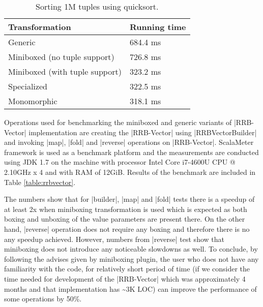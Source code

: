 \begin{table}[t]
  \begin{tabularx}{0.48\textwidth}{|g *{1}{|Y}|} \hline
    \textbf{Transformation} & \textbf{Running time}  \\ \hline
    Generic                        &              684.4 ms  \\
    Miniboxed (no tuple support)   &              726.8 ms  \\
    Miniboxed (with tuple support) &              323.2 ms  \\
    Specialized                    &              322.5 ms  \\
    Monomorphic                    &              318.1 ms  \\ \hline
  \end{tabularx}
  \vspace{-2mm}
  \caption{Sorting 1M tuples using quicksort.}
  \label{table:tuple}
  \vspace{-3em}
\end{table}


Operations used for benchmarking the miniboxed and generic variants of |RRB-Vector| implementation are creating the |RRB-Vector| using |RRBVectorBuilder| and invoking |map|, |fold| and |reverse| operations on |RRB-Vector|. ScalaMeter framework \cite{scalameter} is used as a benchmark platform and the measurements are conducted using JDK 1.7 on the machine with processor Intel Core i7-4600U CPU @ 2.10GHz x 4 and with RAM of 12GiB. Results of the benchmark are included in Table \ref{table:rrbvector}.

The numbers show that for |builder|, |map| and |fold| tests there is a speedup of at least 2x when miniboxing transformation is used which is expected as both boxing and unboxing of the value parameters are present there. On the other hand, |reverse| operation does not require any boxing and therefore there is no any speedup achieved. However, numbers from |reverse| test show that miniboxing does not introduce any noticeable slowdowns as well. To conclude, by following the advises given by miniboxing plugin, the user who does not have any familiarity with the code, for relatively short period of time (if we consider the time needed for development of the |RRB-Vector| which was approximately 4 months and that implementation has \textasciitilde3K LOC) can improve the performance of some operations by 50\%.



